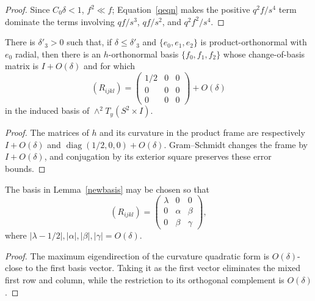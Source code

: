 \begin{proof}
\sketch
Since $C_0\delta<1$, $f^2\ll f$; Equation~\eqref{qeqn} makes the positive
$q^2f/s^4$ term dominate the terms involving $qf/s^3$, $qf/s^2$, and
$q^2f^2/s^4$.
\end{proof}

\begin{lemma}
\label{lem:near-cylinder-curvature-eigenbasis}
\label{newbasis}
There is $\delta'_3>0$ such that, if $\delta\leq\delta'_3$ and
$\{e_0,e_1,e_2\}$ is product-orthonormal with $e_0$ radial, then there is an
$h$-orthonormal basis $\{f_0,f_1,f_2\}$ whose change-of-basis matrix is
$I+O(\delta)$ and for which
\[
  (R_{ijkl})=
  \begin{pmatrix}1/2&0&0\\0&0&0\\0&0&0\end{pmatrix}+O(\delta)
\]
in the induced basis of $\wedge^2T_y(S^2\times I)$.
\end{lemma}

\begin{proof}
\sketch
The matrices of $h$ and its curvature in the product frame are respectively
$I+O(\delta)$ and
$\operatorname{diag}(1/2,0,0)+O(\delta)$. Gram--Schmidt changes the frame by
$I+O(\delta)$, and conjugation by its exterior square preserves these error
bounds.
\end{proof}

\begin{corollary}
\label{cor:curvature-diagonal-block-basis}
\label{2ndnewbasis}
The basis in Lemma~\ref{newbasis} may be chosen so that
\[
  (R_{ijkl})=
  \begin{pmatrix}\lambda&0&0\\0&\alpha&\beta\\0&\beta&\gamma\end{pmatrix},
\]
where
$|\lambda-1/2|,|\alpha|,|\beta|,|\gamma|=O(\delta)$.
\end{corollary}

\begin{proof}
\sketch
The maximum eigendirection of the curvature quadratic form is
$O(\delta)$-close to the first basis vector. Taking it as the first vector
eliminates the mixed first row and column, while the restriction to its
orthogonal complement is $O(\delta)$.
\end{proof}

